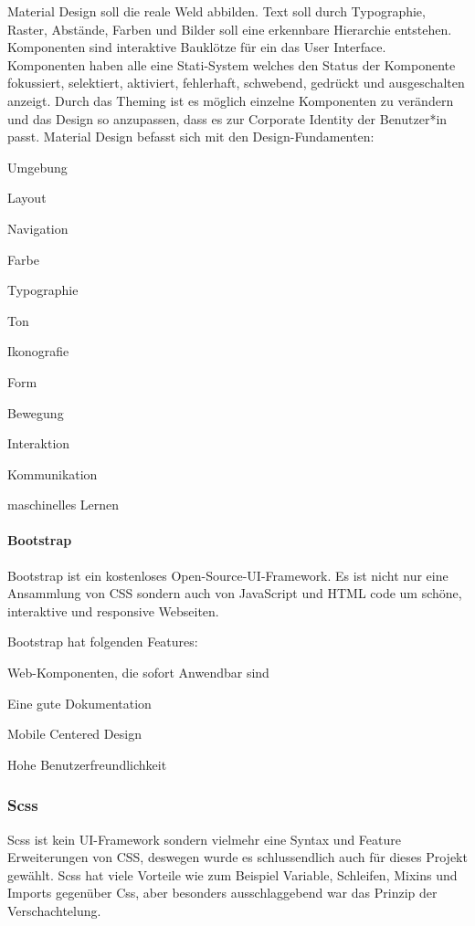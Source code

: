 Material Design soll die reale Weld abbilden.
Text soll durch Typographie, Raster, Abstände, Farben und Bilder soll eine erkennbare Hierarchie entstehen. Komponenten sind interaktive Bauklötze für ein das User Interface. Komponenten haben alle eine Stati-System welches den Status der Komponente fokussiert, selektiert, aktiviert, fehlerhaft, schwebend, gedrückt und ausgeschalten anzeigt. Durch das Theming ist es möglich einzelne Komponenten zu verändern und das Design so anzupassen, dass es zur Corporate Identity der Benutzer*in passt.
Material Design befasst sich mit den Design-Fundamenten:
\begin{compactitem}
    \item Umgebung
    \item Layout
    \item Navigation
    \item Farbe
    \item Typographie
    \item Ton
    \item Ikonografie
    \item Form
    \item Bewegung
    \item Interaktion
    \item Kommunikation
    \item maschinelles Lernen
\end{compactitem}
\cite{MaterialDesign-Introduction}

\paragraph{Bootstrap}
Bootstrap ist ein kostenloses Open-Source-UI-Framework. Es ist nicht nur eine Ansammlung von CSS sondern auch von JavaScript und HTML code um schöne, interaktive und responsive Webseiten. 

Bootstrap hat folgenden Features: 
\begin{compactitem}
    \item Web-Komponenten, die sofort Anwendbar sind
    \item Eine gute Dokumentation
    \item Mobile Centered Design
    \item Hohe Benutzerfreundlichkeit
\end{compactitem}
\cite{BestCSSFrameworksin2022}

\subsubsection{Scss}
Scss ist kein UI-Framework sondern vielmehr eine Syntax und Feature Erweiterungen von CSS, deswegen wurde es schlussendlich auch für dieses Projekt gewählt. Scss hat viele Vorteile wie zum Beispiel Variable, Schleifen, Mixins und Imports gegenüber Css, aber besonders ausschlaggebend war das Prinzip der Verschachtelung. 
